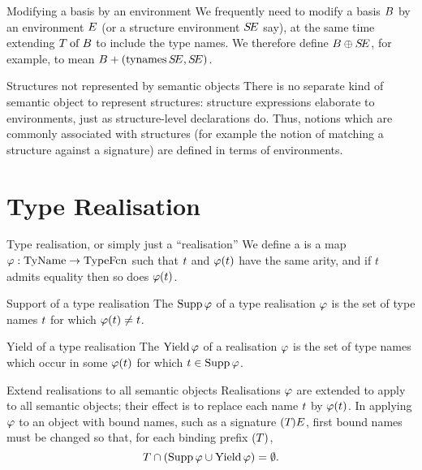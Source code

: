 \begin{definition}{Modifying a basis by an environment}
We frequently need to modify a basis $B$ by an environment $E$
(or a structure environment $\mbox{$S\!E$}$ say),
at the same time extending $T \mathbin{\rm of} B$ to include the type names.
We therefore define $B\oplus\mbox{$S\!E$}$, for example, to mean
$B+(\mathop{\rm tynames}\nolimits\mbox{$S\!E$},\mbox{$S\!E$})$.
\end{definition}

\begin{clause}{Structures not represented by semantic objects}
There is no separate kind of semantic object to represent structures:
structure expressions elaborate to environments, just as structure-level
declarations do. Thus, notions which are commonly associated with
structures (for example the notion of matching a structure against a
signature) are defined in terms of environments.
\end{clause}

\section{Type Realisation}

\begin{definition}{Type realisation, or simply just a ``realisation''}
We define a  is a map
$\varphi:{\rm TyName}\to{\rm TypeFcn}$
such that
$t$ and $\varphi(t)$ have the same arity, and
if $t$ admits equality then so does $\varphi(t)$.
\end{definition}

\begin{definition}{Support of a type realisation}
The  $\mathop{\rm Supp}\nolimits\varphi$ of a type realisation $\varphi$ is the set of
type names $t$ for which $\varphi(t)\ne t$.
\end{definition}

\begin{definition}{Yield of a type realisation}
The  $\mathop{\rm Yield}\nolimits\varphi$ of a realisation $\varphi$ is the set of
type names which occur in some $\varphi(t)$ for which $t\in\mathop{\rm Supp}\nolimits\varphi$.
\end{definition}

\begin{clause}{Extend realisations to all semantic objects}
Realisations $\varphi$ are extended to apply to all semantic objects; their
effect is to
replace each name $t$ by $\varphi(t)$. In applying $\varphi$ to an object with
bound names, such as a signature $(T_{})E_{}$, first bound names must be
changed so that, for each binding prefix $(T)$,
\begin{equation*}
T\cap(\mathop{\rm Supp}\nolimits\varphi\cup\mathop{\rm Yield}\nolimits\varphi)=\emptyset.
\end{equation*}
\end{clause}

